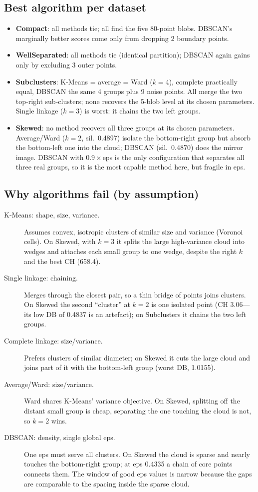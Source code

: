 \documentclass[11pt]{article}
\begin{document}
\subsection{Best algorithm per dataset}
\begin{itemize}
\item \textbf{Compact}: all methods tie; all find the five 80-point blobs. DBSCAN's marginally
better scores come only from dropping 2 boundary points.
\item \textbf{WellSeparated}: all methods tie (identical partition); DBSCAN again gains only by
excluding 3 outer points.
\item \textbf{Subclusters}: K-Means = average = Ward ($k=4$), complete practically equal, DBSCAN the
same 4 groups plus 9 noise points. All merge the two top-right sub-clusters; none recovers the
5-blob level at its chosen parameters. Single linkage ($k=3$) is worst: it chains the two left groups.
\item \textbf{Skewed}: no method recovers all three groups at its chosen parameters. Average/Ward
($k=2$, sil.\ 0.4897) isolate the bottom-right group but absorb the bottom-left one into the cloud;
DBSCAN (sil.\ 0.4870) does the mirror image. DBSCAN with $0.9\times$eps is the only configuration
that separates all three real groups, so it is the most capable method here, but fragile in eps.
\end{itemize}

\subsection{Why algorithms fail (by assumption)}
\begin{description}
\item[K-Means: shape, size, variance.] Assumes convex, isotropic clusters of similar size and
variance (Voronoi cells). On Skewed, with $k=3$ it splits the large high-variance cloud into wedges
and attaches each small group to one wedge, despite the right $k$ and the best CH (658.4).
\item[Single linkage: chaining.] Merges through the closest pair, so a thin bridge of points joins
clusters. On Skewed the second ``cluster'' at $k=2$ is one isolated point (CH 3.06---its low DB of
0.4837 is an artefact); on Subclusters it chains the two left groups.
\item[Complete linkage: size/variance.] Prefers clusters of similar diameter; on Skewed it cuts the
large cloud and joins part of it with the bottom-left group (worst DB, 1.0155).
\item[Average/Ward: size/variance.] Ward shares K-Means' variance objective. On Skewed, splitting
off the distant small group is cheap, separating the one touching the cloud is not, so $k=2$ wins.
\item[DBSCAN: density, single global eps.] One eps must serve all clusters. On Skewed the cloud is
sparse and nearly touches the bottom-right group; at eps 0.4335 a chain of core points connects
them. The window of good eps values is narrow because the gaps are comparable to the spacing inside
the sparse cloud.
\end{description}
\end{document}
